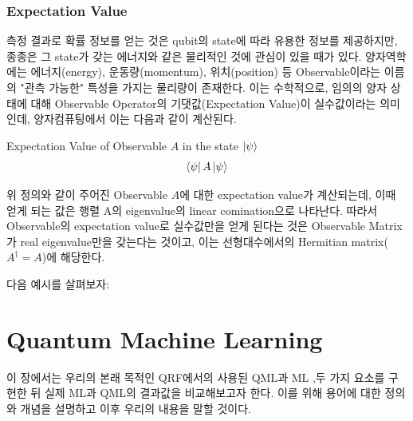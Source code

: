 \subsubsection{Expectation Value}

측정 결과로 확률 정보를 얻는 것은 qubit의 state에 따라 유용한 정보를 제공하지만, 종종은 그 state가 갖는 에너지와 같은 물리적인 것에 관심이 있을 때가 있다. 양자역학에는 에너지(energy), 운동량(momentum), 위치(position) 등 Observable이라는 이름의 "관측 가능한" 특성을 가지는 물리량이 존재한다. 이는 수학적으로, 임의의 양자 상태에 대해 Observable Operator의 기댓값(Expectation Value)이 실수값이라는 의미인데, 양자컴퓨팅에서 이는 다음과 같이 계산된다.
\begin{definition}
    Expectation Value of Observable \(A\) in the state \(\ket \psi\)
    \[
        \bra{\psi}A\ket{\psi}
    \]
\end{definition}

위 정의와 같이 주어진 Observable \(A\)에 대한 expectation value가 계산되는데, 이때 얻게 되는 값은 행렬 A의 eigenvalue의 linear comination으로 나타난다. 따라서 Observable의 expectation value로 실수값만을 얻게 된다는 것은 Observable Matrix가 real eigenvalue만을 갖는다는 것이고, 이는 선형대수에서의 Hermitian matrix(\(A^\dagger = A\))에 해당한다.

\noindent 다음 예시를 살펴보자:

\begin{example}

\end{example}


\section{Quantum Machine Learning}
 이 장에서는 우리의 본래 목적인 QRF에서의 사용된 QML과 ML ,두 가지 요소를 구현한 뒤 실제 ML과 QML의 결과값을 비교해보고자 한다. 이를 위해 용어에 대한 정의와 개념을 설명하고 이후 우리의 내용을 말할 것이다.

